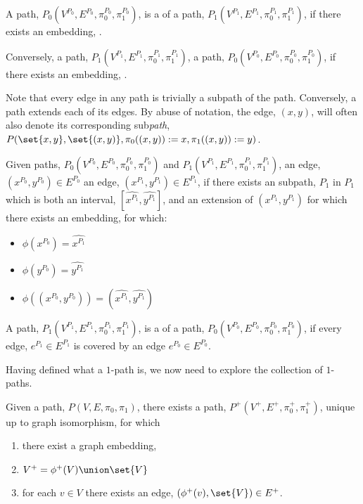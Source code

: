 \documentclass[a4paper]{amsart}
\begin{document}
\begin{definition}
A path, $P_0(V^{P_0}, E^{P_0}, \pi^{P_0}_0, \pi^{P_0}_1)$, is a  of a
path, $P_1(V^{P_1}, E^{P_1}, \pi^{P_1}_0, \pi^{P_1}_1)$, if there exists an embedding,
.

Conversely, a path, $P_1(V^{P_1}, E^{P_1}, \pi^{P_1}_0, \pi^{P_1}_1)$, 
a path, $P_0(V^{P_0}, E^{P_0}, \pi^{P_0}_0, \pi^{P_0}_1)$, if there exists an embedding,
.
\end{definition}

Note that every edge in any path is trivially a subpath of the path. Conversely, a path
extends each of its edges. By abuse of notation, the edge, $(x,y)$, will often also denote
its corresponding sub\emph{path}, $P(\set{x,y}, \set{(x,y)}, \pi_0((x,y)):=x,
\pi_1((x,y)):=y)$.

\begin{definition}
Given paths, $P_0(V^{P_0}, E^{P_0}, \pi^{P_0}_0, \pi^{P_0}_1)$ and $P_1(V^{P_1}, E^{P_1},
\pi^{P_1}_0, \pi^{P_1}_1)$, an edge, $(x^{P_0}, y^{P_0}) \in E^{P_0}$  an
edge, $(x^{P_1}, y^{P_1}) \in E^{P_1}$, if there exists an subpath, $\hat{P_1}$ in $P_1$
which is both an interval, $[\hat{x^{P_1}}, \hat{y^{P_1}}]$, and an extension of
$(x^{P_1}, y^{P_1})$ for which there exists an embedding,  for which:
\begin{itemize}
\item $\phi(x^{P_0}) = \hat{x^{P_1}}$
\item $\phi(y^{P_0}) = \hat{y^{P_1}}$
\item $\phi( (x^{P_0}, y^{P_0}) ) = (\hat{x^{P_1}}, \hat{y^{P_1}})$
\end{itemize}
\end{definition}

\begin{definition}
A path, $P_1(V^{P_1}, E^{P_1}, \pi^{P_1}_0, \pi^{P_1}_1)$, is a  of a
path, $P_0(V^{P_0}, E^{P_0}, \pi^{P_0}_0, \pi^{P_0}_1)$, if every edge, $e^{P_1} \in 
E^{P_1}$ is covered by an edge $e^{P_0} \in E^{P_0}$.
\end{definition}

Having defined what a $1$-path is, we now need to explore the collection of $1$-paths.

\begin{theorem}\label{path:addFinal}
Given a path, $P(V, E, \pi_0, \pi_1)$, there exists a path, $P^+(V^+, E^+, \pi^+_0,
\pi^+_1)$,  unique up to graph isomorphism, for which
\begin{enumerate}
\item there exist a graph embedding, 
\item $V^+ = \phi^+(V) \union \set{V}$
\item for each $v \in V$ there exists an edge, $(\phi^+(v), \set{V}) \in E^+$.
\end{enumerate}
\end{theorem}
\end{document}
